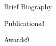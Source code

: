 \begin{resume}
\begin{resumesection}{Brief Biography}

\end{resumesection}

\begin{publicationlist}{Publications}{3}
   
\end{publicationlist}

\begin{publicationlist}{Awards}{9}
 

\end{publicationlist}


\end{resume}
